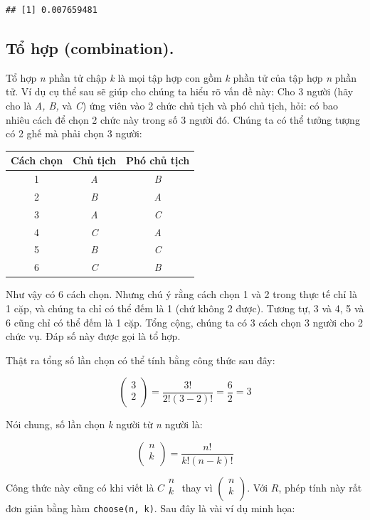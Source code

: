 \documentclass[
]{book}
\begin{document}
\begin{verbatim}
## [1] 0.007659481
\end{verbatim}

\hypertarget{tux1ed5-hux1ee3p-combination.}{%
\subsection{Tổ hợp (combination).}\label{tux1ed5-hux1ee3p-combination.}}

Tổ hợp \emph{n} phần tử chập \emph{k} là mọi tập hợp con gồm \emph{k} phần tử của tập hợp \emph{n} phần tử. Ví dụ cụ thể sau sẽ giúp cho chúng ta hiểu rõ vấn đề này: Cho 3 người (hãy cho là \emph{A, B,} và \emph{C}) ứng viên vào 2 chức chủ tịch và phó chủ tịch, hỏi: có bao nhiêu cách để chọn 2 chức này trong số 3 người đó. Chúng ta có thể tưởng tượng có 2 ghế mà phải chọn 3 người:

\begin{longtable}[]{@{}ccc@{}}
\toprule
Cách chọn & Chủ tịch & Phó chủ tịch\tabularnewline
\midrule
\endhead
1 & \emph{A} & \emph{B}\tabularnewline
2 & \emph{B} & \emph{A}\tabularnewline
3 & \emph{A} & \emph{C}\tabularnewline
4 & \emph{C} & \emph{A}\tabularnewline
5 & \emph{B} & \emph{C}\tabularnewline
6 & \emph{C} & \emph{B}\tabularnewline
\bottomrule
\end{longtable}

Như vậy có 6 cách chọn. Nhưng chú ý rằng cách chọn 1 và 2 trong thực tế chỉ là 1 cặp, và chúng ta chỉ có thể đếm là 1 (chứ không 2 được). Tương tự, 3 và 4, 5 và 6 cũng chỉ có thể đếm là 1 cặp. Tổng cộng, chúng ta có 3 cách chọn 3 người cho 2 chức vụ. Đáp số này được gọi là tổ hợp.

Thật ra tổng số lần chọn có thể tính bằng công thức sau đây:

\[\begin{pmatrix}
3 \\
2 \\
\end{pmatrix} = \frac{3!}{2!\left( 3 - 2 \right)!} = \frac{6}{2} = 3\]

Nói chung, số lần chọn \emph{k} người từ \emph{n} người là:

\[\begin{pmatrix}
n \\
k \\
\end{pmatrix} = \frac{n!}{k!\left( n - k \right)!}\]

Công thức này cũng có khi viết là \(C\begin{matrix} n \\ k \\ \end{matrix}\) thay vì \(\begin{pmatrix} n \\ k \\ \end{pmatrix}\). Với \(R\), phép tính này rất đơn giản bằng hàm \texttt{choose(n,\ k)}.
Sau đây là vài ví dụ minh họa:
\end{document}
